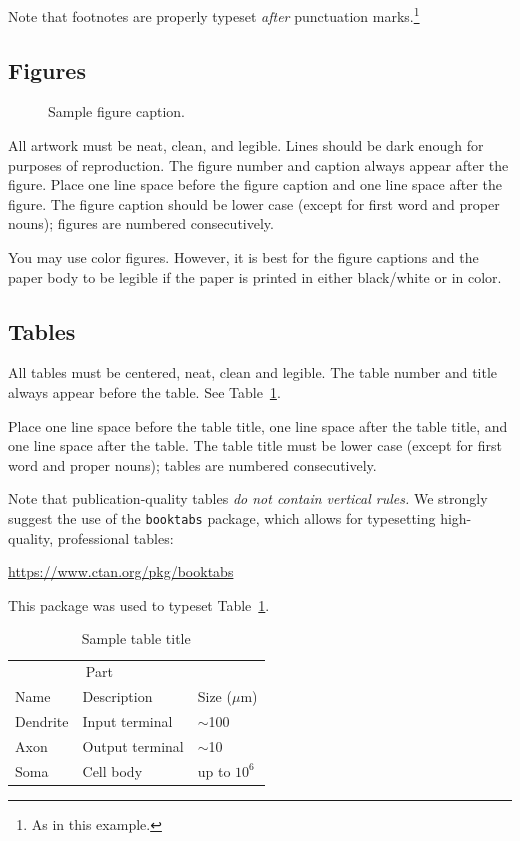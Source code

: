\documentclass{article}
\begin{document}
Note that footnotes are properly typeset \emph{after} punctuation
marks.\footnote{As in this example.}

\subsection{Figures}

\begin{figure}
  \centering
  \fbox{\rule[-.5cm]{0cm}{4cm} \rule[-.5cm]{4cm}{0cm}}
  \caption{Sample figure caption.}
\end{figure}

All artwork must be neat, clean, and legible. Lines should be dark
enough for purposes of reproduction. The figure number and caption
always appear after the figure. Place one line space before the figure
caption and one line space after the figure. The figure caption should
be lower case (except for first word and proper nouns); figures are
numbered consecutively.

You may use color figures.  However, it is best for the figure
captions and the paper body to be legible if the paper is printed in
either black/white or in color.

\subsection{Tables}

All tables must be centered, neat, clean and legible.  The table
number and title always appear before the table.  See
Table~\ref{sample-table}.

Place one line space before the table title, one line space after the
table title, and one line space after the table. The table title must
be lower case (except for first word and proper nouns); tables are
numbered consecutively.

Note that publication-quality tables \emph{do not contain vertical
  rules.} We strongly suggest the use of the \verb+booktabs+ package,
which allows for typesetting high-quality, professional tables:
\begin{center}
  \url{https://www.ctan.org/pkg/booktabs}
\end{center}
This package was used to typeset Table~\ref{sample-table}.

\begin{table}
  \caption{Sample table title}
  \label{sample-table}
  \centering
  \begin{tabular}{lll}
    \toprule
    \multicolumn{2}{c}{Part}                   \\
    \cmidrule(r){1-2}
    Name     & Description     & Size ($\mu$m) \\
    \midrule
    Dendrite & Input terminal  & $\sim$100     \\
    Axon     & Output terminal & $\sim$10      \\
    Soma     & Cell body       & up to $10^6$  \\
    \bottomrule
  \end{tabular}
\end{table}
\end{document}
